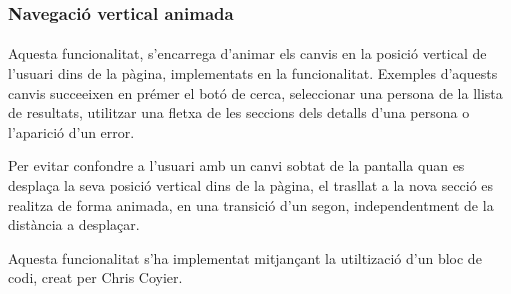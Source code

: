 \subsubsection{Navegació vertical animada}

\paragraph{}
Aquesta funcionalitat, s'encarrega d'animar els canvis en la posició vertical de l'usuari dins de la pàgina, implementats en la funcionalitat. Exemples d'aquests canvis succeeixen en prémer el botó de cerca, seleccionar una persona de la llista de resultats, utilitzar una fletxa de les seccions dels detalls d'una persona o l'aparició d'un error.

Per evitar confondre a l'usuari amb un canvi sobtat de la pantalla quan es des\-pla\-ça la seva posició vertical dins de la pàgina, el trasllat a la nova secció es realitza de forma animada, en una transició d'un segon, independentment de la distància a desplaçar.

Aquesta funcionalitat s'ha implementat mitjançant la utiltizació d'un bloc de codi, creat per Chris Coyier.
